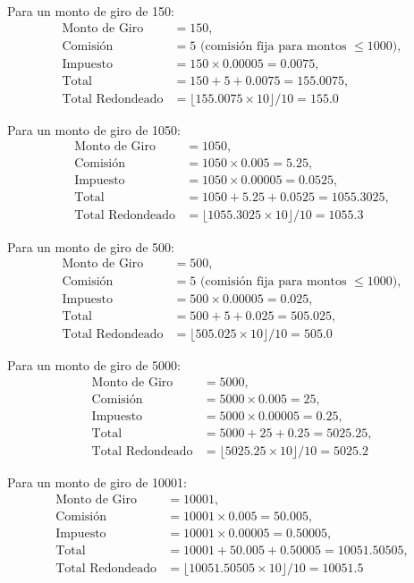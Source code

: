 \documentclass[11pt,a4paper]{article}
\begin{document}
Para un monto de giro de 150:
\begin{align*}
\text{Monto de Giro} &= 150, \\
\text{Comisión} &= 5 \text{ (comisión fija para montos } \leq 1000), \\
\text{Impuesto} &= 150 \times 0.00005 = 0.0075, \\
\text{Total} &= 150 + 5 + 0.0075 = 155.0075, \\
\text{Total Redondeado} &= \lfloor 155.0075 \times 10 \rfloor / 10 = 155.0
\end{align*}

Para un monto de giro de 1050:
\begin{align*}
\text{Monto de Giro} &= 1050, \\
\text{Comisión} &= 1050 \times 0.005 = 5.25, \\
\text{Impuesto} &= 1050 \times 0.00005 = 0.0525, \\
\text{Total} &= 1050 + 5.25 + 0.0525 = 1055.3025, \\
\text{Total Redondeado} &= \lfloor 1055.3025 \times 10 \rfloor / 10 = 1055.3
\end{align*}

Para un monto de giro de 500:
\begin{align*}
\text{Monto de Giro} &= 500, \\
\text{Comisión} &= 5 \text{ (comisión fija para montos } \leq 1000), \\
\text{Impuesto} &= 500 \times 0.00005 = 0.025, \\
\text{Total} &= 500 + 5 + 0.025 = 505.025, \\
\text{Total Redondeado} &= \lfloor 505.025 \times 10 \rfloor / 10 = 505.0
\end{align*}

Para un monto de giro de 5000:
\begin{align*}
\text{Monto de Giro} &= 5000, \\
\text{Comisión} &= 5000 \times 0.005 = 25, \\
\text{Impuesto} &= 5000 \times 0.00005 = 0.25, \\
\text{Total} &= 5000 + 25 + 0.25 = 5025.25, \\
\text{Total Redondeado} &= \lfloor 5025.25 \times 10 \rfloor / 10 = 5025.2
\end{align*}

Para un monto de giro de 10001:
\begin{align*}
\text{Monto de Giro} &= 10001, \\
\text{Comisión} &= 10001 \times 0.005 = 50.005, \\
\text{Impuesto} &= 10001 \times 0.00005 = 0.50005, \\
\text{Total} &= 10001 + 50.005 + 0.50005 = 10051.50505, \\
\text{Total Redondeado} &= \lfloor 10051.50505 \times 10 \rfloor / 10 = 10051.5
\end{align*}
\end{document}

